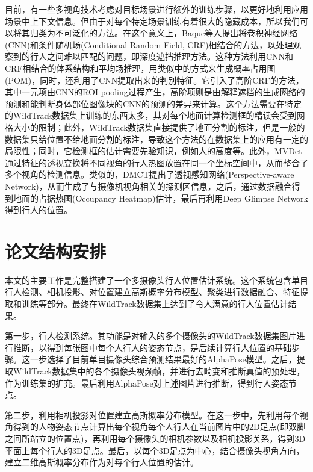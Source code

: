 目前，有一些多视角技术考虑对目标场景进行额外的训练步骤，以更好地利用应用场景中上下文信息。但由于对每个特定场景训练有着很大的隐藏成本，所以我们可以将其归类为不可泛化的方法\cite{lima2021generalizable}。在这个意义上，Baque等人\cite{baque2017deep}提出将卷积神经网络(CNN)和条件随机场(Conditional Random Field, CRF)相结合的方法，以处理观察到的行人之间难以匹配的问题，即深度遮挡推理方法\cite{baque2017deep}。这种方法利用CNN和CRF相结合的体系结构和平均场推理，用类似\cite{fleuret2007multicamera}中的方式来生成概率占用图(POM)，同时，还利用了CNN提取出来的判别特征。它引入了高阶CRF的方法，其中一元项由CNN的ROI pooling过程产生\cite{faster2015towards}，高阶项则是由解释遮挡的生成网络的预测和能判断身体部位图像块的CNN的预测的差异来计算。这个方法需要在特定的WildTrack数据集上训练的东西太多，其对每个地面计算检测框的精读会受到网格大小的限制；此外，WildTrack数据集直接提供了地面分割的标注，但是一般的数据集只给位置不给地面分割的标注，导致这个方法的在数据集上的应用有一定的局限性；同时，它检测框的估计需要先验知识，例如人的高度等。此外，MVDet\cite{hou2020multiview}通过特征的透视变换将不同视角的行人热图放置在同一个坐标空间中，从而整合了多个视角的检测信息。类似的，DMCT\cite{you2020real}提出了透视感知网络(Perspective-aware Network)，从而生成了与摄像机视角相关的探测区信息，之后，通过数据融合得到地面的占据热图(Occupancy Heatmap)估计，最后再利用Deep Glimpse Network得到行人的位置。

\section{论文结构安排}

本文的主要工作是完整搭建了一个多摄像头行人位置估计系统。这个系统包含单目行人检测、相机投影、对位置建立高斯概率分布模型、聚类进行数据融合、特征提取和训练等部分。最终在WildTrack数据集上达到了令人满意的行人位置估计结果。

第一步，行人检测系统。其功能是对输入的多个摄像头的WildTrack数据集图片进行推断，以得到每张图中每个人行人的姿态节点，是后续计算行人位置的基础步骤。这一步选择了目前单目摄像头综合预测结果最好的AlphaPose\cite{fang2017rmpe, li2019crowdpose, xiu2018poseflow}模型。之后，提取WildTrack数据集中的各个摄像头视频帧，并进行去畸变和推断真值的预处理，作为训练集的扩充。最后利用AlphaPose对上述图片进行推断，得到行人姿态节点。

第二步，利用相机投影对位置建立高斯概率分布模型。在这一步中，先利用每个视角得到的人物姿态节点计算出每个视角每个人行人在当前图片中的2D足点(即双脚之间所站立的位置点)，再利用每个摄像头的相机参数以及相机投影关系，得到3D平面上每个行人的3D足点。最后，以每个3D足点为中心，结合摄像头视角方向，建立二维高斯概率分布作为对每个行人位置的估计。


